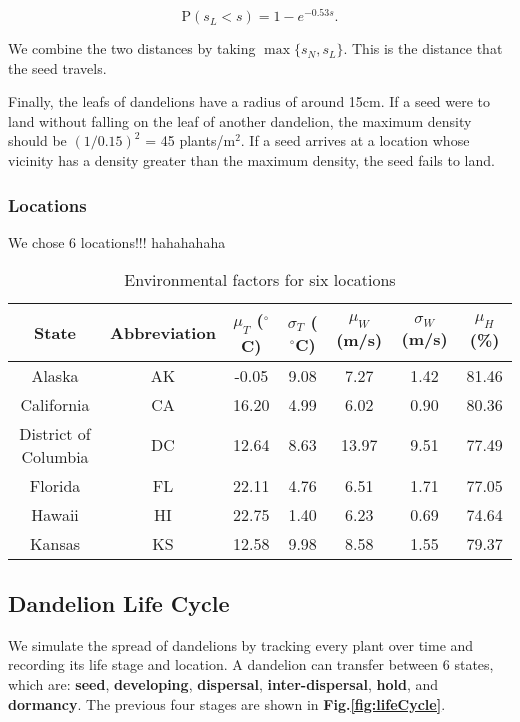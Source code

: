 \documentclass[12pt]{article}
\begin{document}
			\begin{equation}
				\mathrm{P} (s_L < s) = 1 - e^{-0.53 s}.
			\end{equation}
			
			We combine the two distances by taking $\max\{s_N, s_L\}$.   This is the distance that the seed travels.
			
			Finally, the leafs of dandelions have a radius of around 15cm.  If a seed were to land without falling on the leaf of another dandelion, the maximum density should be $(1/0.15)^2$ = 45 plants/m$^2$.  If a seed arrives at a location whose vicinity has a density greater than the maximum density, the seed fails to land.
		
		\subsubsection{Locations}
		
			We chose 6 locations!!! hahahahaha
						
			{
				\fontsize{10}{14}\selectfont
				{
					\begin{longtable}{ccccccc}
						\caption{Environmental factors for six locations}
						\label{tb:locs}\\
						\toprule
						State&Abbreviation&$\mu_T$ ($^\circ$C)&$\sigma_T$ ($^\circ$C)&$\mu_W$ (m/s)&$\sigma_W$ (m/s)&$\mu_H$ (\%)\\
						\toprule
						Alaska&AK&-0.05&9.08&7.27&1.42&81.46\\
						California&CA&16.20&4.99&6.02&0.90&80.36\\
						District of Columbia&DC&12.64&8.63&13.97&9.51&77.49\\
						Florida&FL&22.11&4.76&6.51&1.71&77.05\\
						Hawaii&HI&22.75&1.40&6.23&0.69&74.64\\
						Kansas&KS&12.58&9.98&8.58&1.55&79.37\\
						\bottomrule
					\end{longtable}
				}
			}
		
	\subsection{Dandelion Life Cycle}
	
		We simulate the spread of dandelions by tracking every plant over time and recording its life stage and location.  A dandelion can transfer between 6 states, which are: \textbf{seed}, \textbf{developing}, \textbf{dispersal}, \textbf{inter-dispersal}, \textbf{hold}, and \textbf{dormancy}.  The previous four stages are shown in \textbf{Fig.\ref{fig:lifeCycle}}.
		
\end{document}
